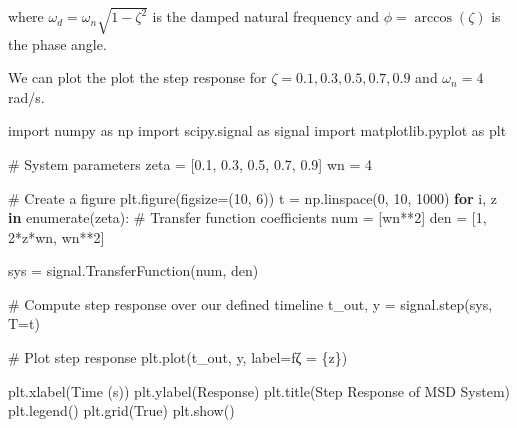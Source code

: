 \documentclass[
  letterpaper,
  DIV=11,
  numbers=noendperiod]{scrreprt}
\newenvironment{Shaded}{\begin{snugshade}}{\end{snugshade}}
\newcommand{\BuiltInTok}[1]{\textcolor[rgb]{0.00,0.23,0.31}{#1}}
\newcommand{\CommentTok}[1]{\textcolor[rgb]{0.37,0.37,0.37}{#1}}
\newcommand{\ControlFlowTok}[1]{\textcolor[rgb]{0.00,0.23,0.31}{\textbf{#1}}}
\newcommand{\DecValTok}[1]{\textcolor[rgb]{0.68,0.00,0.00}{#1}}
\newcommand{\FloatTok}[1]{\textcolor[rgb]{0.68,0.00,0.00}{#1}}
\newcommand{\ImportTok}[1]{\textcolor[rgb]{0.00,0.46,0.62}{#1}}
\newcommand{\KeywordTok}[1]{\textcolor[rgb]{0.00,0.23,0.31}{\textbf{#1}}}
\newcommand{\NormalTok}[1]{\textcolor[rgb]{0.00,0.23,0.31}{#1}}
\newcommand{\OperatorTok}[1]{\textcolor[rgb]{0.37,0.37,0.37}{#1}}
\newcommand{\SpecialCharTok}[1]{\textcolor[rgb]{0.37,0.37,0.37}{#1}}
\newcommand{\SpecialStringTok}[1]{\textcolor[rgb]{0.13,0.47,0.30}{#1}}
\newcommand{\StringTok}[1]{\textcolor[rgb]{0.13,0.47,0.30}{#1}}
\newcommand{\VariableTok}[1]{\textcolor[rgb]{0.07,0.07,0.07}{#1}}
\begin{document}
where \(\omega_d = \omega_n\sqrt{1-\zeta^2}\) is the damped natural
frequency and \(\phi = \arccos(\zeta)\) is the phase angle.

We can plot the plot the step response for
\(\zeta = 0.1, 0.3, 0.5, 0.7, 0.9\) and \(\omega_n = 4\) rad/s.

\begin{Shaded}
\begin{Highlighting}[]
\ImportTok{import}\NormalTok{ numpy }\ImportTok{as}\NormalTok{ np}
\ImportTok{import}\NormalTok{ scipy.signal }\ImportTok{as}\NormalTok{ signal}
\ImportTok{import}\NormalTok{ matplotlib.pyplot }\ImportTok{as}\NormalTok{ plt}

\CommentTok{\# System parameters}
\NormalTok{zeta }\OperatorTok{=}\NormalTok{ [}\FloatTok{0.1}\NormalTok{, }\FloatTok{0.3}\NormalTok{, }\FloatTok{0.5}\NormalTok{, }\FloatTok{0.7}\NormalTok{, }\FloatTok{0.9}\NormalTok{]}
\NormalTok{wn }\OperatorTok{=} \DecValTok{4}

\CommentTok{\# Create a figure}
\NormalTok{plt.figure(figsize}\OperatorTok{=}\NormalTok{(}\DecValTok{10}\NormalTok{, }\DecValTok{6}\NormalTok{))}
\NormalTok{t }\OperatorTok{=}\NormalTok{ np.linspace(}\DecValTok{0}\NormalTok{, }\DecValTok{10}\NormalTok{, }\DecValTok{1000}\NormalTok{)}
\ControlFlowTok{for}\NormalTok{ i, z }\KeywordTok{in} \BuiltInTok{enumerate}\NormalTok{(zeta):}
    \CommentTok{\# Transfer function coefficients}
\NormalTok{    num }\OperatorTok{=}\NormalTok{ [wn}\OperatorTok{**}\DecValTok{2}\NormalTok{]}
\NormalTok{    den }\OperatorTok{=}\NormalTok{ [}\DecValTok{1}\NormalTok{, }\DecValTok{2}\OperatorTok{*}\NormalTok{z}\OperatorTok{*}\NormalTok{wn, wn}\OperatorTok{**}\DecValTok{2}\NormalTok{]}
    
\NormalTok{    sys }\OperatorTok{=}\NormalTok{ signal.TransferFunction(num, den)}
    
    \CommentTok{\# Compute step response over our defined timeline}
\NormalTok{    t\_out, y }\OperatorTok{=}\NormalTok{ signal.step(sys, T}\OperatorTok{=}\NormalTok{t)}

    \CommentTok{\# Plot step response}
\NormalTok{    plt.plot(t\_out, y, label}\OperatorTok{=}\SpecialStringTok{f\textquotesingle{}ζ = }\SpecialCharTok{\{}\NormalTok{z}\SpecialCharTok{\}}\SpecialStringTok{\textquotesingle{}}\NormalTok{)}

\NormalTok{plt.xlabel(}\StringTok{\textquotesingle{}Time (s)\textquotesingle{}}\NormalTok{)}
\NormalTok{plt.ylabel(}\StringTok{\textquotesingle{}Response\textquotesingle{}}\NormalTok{)}
\NormalTok{plt.title(}\StringTok{\textquotesingle{}Step Response of MSD System\textquotesingle{}}\NormalTok{)}
\NormalTok{plt.legend()}
\NormalTok{plt.grid(}\VariableTok{True}\NormalTok{)}
\NormalTok{plt.show()}
\end{Highlighting}
\end{Shaded}
\end{document}
